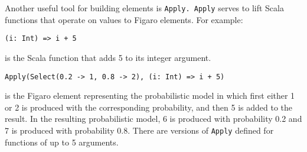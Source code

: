 Another useful tool for building elements is \texttt{Apply. Apply} serves to lift Scala functions that operate on values to Figaro elements. For example:

\begin{flushleft}
\texttt{(i: Int) => i + 5}
\end{flushleft}

is the Scala function that adds 5 to its integer argument.

\begin{flushleft}
\texttt{Apply(Select(0.2 -> 1, 0.8 -> 2), (i: Int) => i + 5)}
\end{flushleft}

is the Figaro element representing the probabilistic model in which first either 1 or 2 is produced with the corresponding probability, and then 5 is added to the result. In the resulting probabilistic model, 6 is produced with probability 0.2 and 7 is produced with probability 0.8. There are versions of \texttt{Apply} defined for functions of up to 5 arguments. 






